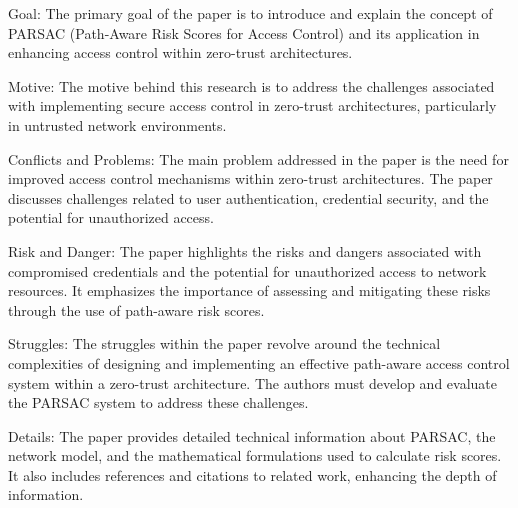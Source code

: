 \documentclass{article}
\begin{document}
Goal: The primary goal of the paper is to introduce and explain the concept of PARSAC (Path-Aware Risk Scores for Access Control) and its application in enhancing access control within zero-trust architectures.

Motive: The motive behind this research is to address the challenges associated with implementing secure access control in zero-trust architectures, particularly in untrusted network environments.

Conflicts and Problems: The main problem addressed in the paper is the need for improved access control mechanisms within zero-trust architectures. The paper discusses challenges related to user authentication, credential security, and the potential for unauthorized access.

Risk and Danger: The paper highlights the risks and dangers associated with compromised credentials and the potential for unauthorized access to network resources. It emphasizes the importance of assessing and mitigating these risks through the use of path-aware risk scores.

Struggles: The struggles within the paper revolve around the technical complexities of designing and implementing an effective path-aware access control system within a zero-trust architecture. The authors must develop and evaluate the PARSAC system to address these challenges.

Details: The paper provides detailed technical information about PARSAC, the network model, and the mathematical formulations used to calculate risk scores. It also includes references and citations to related work, enhancing the depth of information.

\newpage
\end{document}
